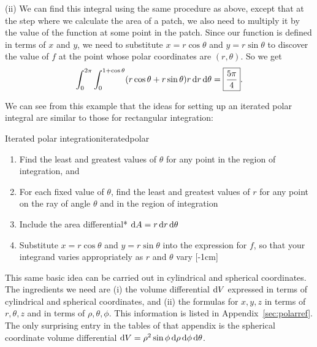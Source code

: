 \documentclass{watsonbook}
\begin{document}
\begin{solution}
              
    (ii) We can find this integral using the same procedure as above,
    except that at the step where we calculate the area of a patch, we
    also need to multiply it by the value of the function at some point
    in the patch. Since our function is defined in terms of $x$ and
    $y$, we need to substitute $x = r\cos \theta$ and $y = r\sin
    \theta$ to discover the value of $f$ at the point whose polar
    coordinates are $(r,\theta)$. So we get
    \[
      \int_0^{2\pi} \int_0^{1+\cos \theta} (r \cos\theta + r\sin
      \theta)r \, {\mathrm{d}}r \, \mathrm{d}\theta = \boxed{\frac{5\pi}{4}}. 
    \]
\end{solution}

We can see from this example that the ideas for setting up an iterated
polar integral are similar to those for 
rectangular integration:
\begin{obs}{Iterated polar integration}{iteratedpolar}
\begin{enumerate}[itemsep = 6pt, topsep = 5pt, leftmargin=12pt]
\item Find the least and greatest values of $\theta$ for any point in
  the region of integration, and 
\item For each fixed value of $\theta$, find the least and greatest
  values of $r$ for any point on the ray of angle $\theta$ and in the
  region of integration
\item Include the area differential* $\mathrm{d} A = r \, {\mathrm{d}}r \, \mathrm{d}\theta$
\item Substitute $x = r \cos\theta$ and $y=r\sin \theta$ into the
  expression for $f$, so
  that your integrand varies appropriately as $r$ and $\theta$ vary 
  [-1cm]
\end{enumerate}
\end{obs}

This same basic idea can be carried out in cylindrical and spherical
coordinates. The ingredients we need are (i) the volume differential
$\mathrm{d} V$ expressed in terms of cylindrical and spherical coordinates, and
(ii) the formulas for $x, y, z$ in terms of $r, \theta, z$ and in
terms of $\rho, \theta, \phi$. This information is listed in
Appendix~\ref{sec:polarref}. The only surprising entry in the tables
of that appendix is the spherical coordinate volume differential $\mathrm{d} V =
\rho^2 \sin \phi \, {\mathrm{d}}\rho \, {\mathrm{d}} \phi \, \mathrm{d}\theta$.
\end{document}
